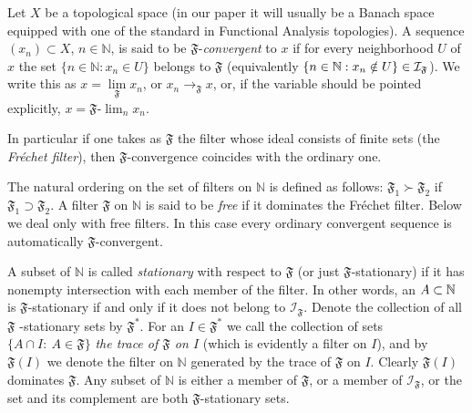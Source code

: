 \documentclass[11pt,twoside, reqno]{amsart}
\newcommand{\N}{{\mathbb N}}
\newcommand{\F}{\mathfrak{F}}
\newcommand{\flim}{\lim\limits_\F }
\theoremstyle{plain}
\theoremstyle{remark}
\theoremstyle{definition}
\numberwithin{equation}{section}
\begin{document}
Let $X$ be a topological space (in our paper it will usually be a Banach space equipped with one of the standard in Functional Analysis topologies). A sequence $(x_n) \subset X$, $n \in  \N$,  is said to be $\F$-\textit{convergent} to $x$ if for every neighborhood $U$
of $x$ the set $\{n \in \N: x_n \in U\}$ belongs to $\F$
(equivalently $\{n \in \N: x_n \notin U\} \in \mathcal{I}_{%
\F}$). We write this as $x=\flim x_n$, or $x_n \to_\F x$, or, if the variable should be pointed explicitly, $x=\F
\text{-}\lim_n x_n$.


 In particular if one takes as $\F$ the filter whose
ideal consists of finite sets (the \textit{Fr\'echet filter}), then $%
\F$-convergence coincides with the ordinary one.

The natural ordering on the set of filters on $\N$ is defined as
follows: $\F_1 \succ \F_2$ if $\F_1 \supset
\F_2$.
A filter $\F$ on $\N$ is said to be \textit{free} if it
dominates the Fr\'echet filter. Below we deal only with free filters. In this case every ordinary convergent sequence is automatically $\F$-convergent.

A subset of $\N$ is called \textit{stationary} with respect to $%
\F$ (or just $\F$-stationary) if it has nonempty
intersection with each member of the filter. In other words, an $A \subset {%
\mathbb{N}}$ is $\F$-stationary if and only if it does not belong
to $\mathcal{I}_{\F}$. Denote the collection of all $\F$%
-stationary sets by $\F^*$. 
For an $I \in \F^*$ we call
the collection of sets $\{A\cap I:\ A\in\F\}$ \textit{the trace of $%
\F$ on $I$} (which is evidently a filter on $I$), and by $\F(I)$ we denote the filter on $\N$ generated by the trace of $\F$ on $I$. Clearly $\F(I)$ dominates $\F$. 
Any subset of $\N$ is either a member of $\F$, or a member of $\mathcal{I}_{\F}$, or the set and its complement are both $\F$-stationary sets.
\end{document}
